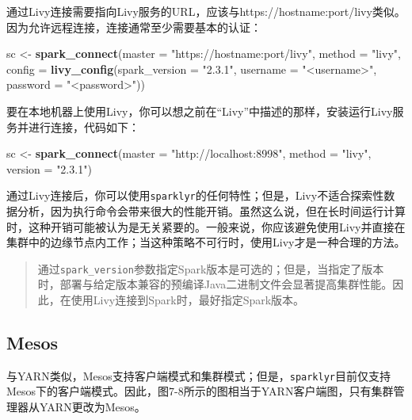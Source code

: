 \documentclass[
]{article}
\newenvironment{Shaded}{\begin{snugshade}}{\end{snugshade}}
\newcommand{\DataTypeTok}[1]{\textcolor[rgb]{0.13,0.29,0.53}{#1}}
\newcommand{\KeywordTok}[1]{\textcolor[rgb]{0.13,0.29,0.53}{\textbf{#1}}}
\newcommand{\NormalTok}[1]{#1}
\newcommand{\StringTok}[1]{\textcolor[rgb]{0.31,0.60,0.02}{#1}}
\begin{document}
通过Livy连接需要指向Livy服务的URL，应该与https://hostname:port/livy类似。因为允许远程连接，连接通常至少需要基本的认证：

\begin{Shaded}
\begin{Highlighting}[]
\NormalTok{sc <-}\StringTok{ }\KeywordTok{spark_connect}\NormalTok{(}\DataTypeTok{master =} \StringTok{"https://hostname:port/livy"}\NormalTok{, }\DataTypeTok{method =} \StringTok{"livy"}\NormalTok{, }\DataTypeTok{config =} \KeywordTok{livy_config}\NormalTok{(}\DataTypeTok{spark_version =} \StringTok{"2.3.1"}\NormalTok{, }
    \DataTypeTok{username =} \StringTok{"<username>"}\NormalTok{, }\DataTypeTok{password =} \StringTok{"<password>"}\NormalTok{))}
\end{Highlighting}
\end{Shaded}

要在本地机器上使用Livy，你可以想之前在``Livy''中描述的那样，安装运行Livy服务并进行连接，代码如下：

\begin{Shaded}
\begin{Highlighting}[]
\NormalTok{sc <-}\StringTok{ }\KeywordTok{spark_connect}\NormalTok{(}\DataTypeTok{master =} \StringTok{"http://localhost:8998"}\NormalTok{, }\DataTypeTok{method =} \StringTok{"livy"}\NormalTok{, }\DataTypeTok{version =} \StringTok{"2.3.1"}\NormalTok{)}
\end{Highlighting}
\end{Shaded}

通过Livy连接后，你可以使用\texttt{sparklyr}的任何特性；但是，Livy不适合探索性数据分析，因为执行命令会带来很大的性能开销。虽然这么说，但在长时间运行计算时，这种开销可能被认为是无关紧要的。一般来说，你应该避免使用Livy并直接在集群中的边缘节点内工作；当这种策略不可行时，使用Livy才是一种合理的方法。

\begin{quote}
通过\texttt{spark\_version}参数指定Spark版本是可选的；但是，当指定了版本时，部署与给定版本兼容的预编译Java二进制文件会显著提高集群性能。因此，在使用Livy连接到Spark时，最好指定Spark版本。
\end{quote}

\hypertarget{mesos}{%
\subsection{Mesos}\label{mesos}}

与YARN类似，Mesos支持客户端模式和集群模式；但是，\texttt{sparklyr}目前仅支持Mesos下的客户端模式。因此，图7-8所示的图相当于YARN客户端图，只有集群管理器从YARN更改为Mesos。
\end{document}
